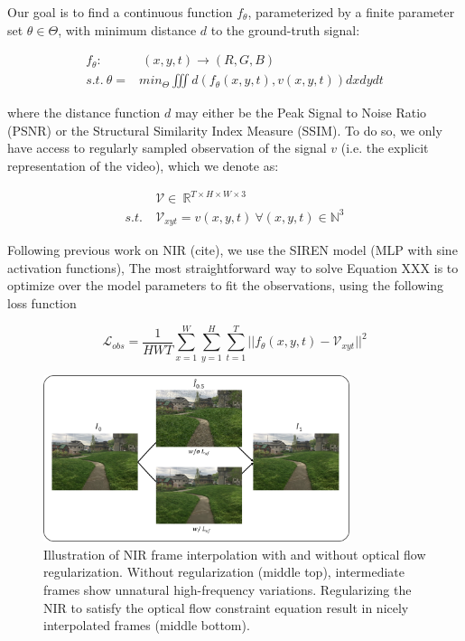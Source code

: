 \documentclass{article}
\begin{document}
Our goal is to find a continuous function $f_{\theta}$, parameterized by a finite parameter set $\theta \in \Theta$,
with minimum distance $d$ to the ground-truth signal:

\begin{equation}
\begin{aligned}
f_{\theta}:& \:(x, y, t) \rightarrow (R, G, B) \\
s.t. \: \theta =& min_{\Theta} \iiint d(f_{\theta}(x,y,t), v(x,y,t)) dx dy dt
\end{aligned}
\end{equation}

where the distance function $d$ may either be the Peak Signal to Noise Ratio (PSNR) or the Structural Similarity Index Measure (SSIM).
To do so, we only have access to regularly sampled observation of the signal $v$
(i.e. the explicit representation of the video), which we denote as:

\begin{equation}
\begin{aligned}
&\mathcal{V} \in  \: \mathbb{R}^{T \times H \times W \times 3} \\
s.t. \: &\mathcal{V}_{xyt} =   v(x, y, t) \: \forall (x, y, t) \in \mathbb{N}^3
\end{aligned}
\end{equation}

Following previous work on NIR (cite), we use the SIREN model (MLP with sine activation functions),
The most straightforward way to solve Equation XXX is to optimize over the model parameters to fit the observations,
using the following loss function

\begin{equation}
\mathcal{L}_{obs} = \frac{1}{HWT} \sum_{x=1}^W\sum_{y=1}^H\sum_{t=1}^T || f_{\theta}(x,y,t) - \mathcal{V}_{xyt} ||^2
\end{equation}

\begin{figure}[t]
\centering
\includegraphics[width=0.8\textwidth]{"w_wo_OF"}
\caption{Illustration of NIR frame interpolation with and without optical flow regularization.
Without regularization (middle top), intermediate frames show unnatural high-frequency variations.
Regularizing the NIR to satisfy the optical flow constraint equation result in nicely interpolated frames (middle bottom).
}
\label{fig_w_wo_OF}
\end{figure}
\end{document}
